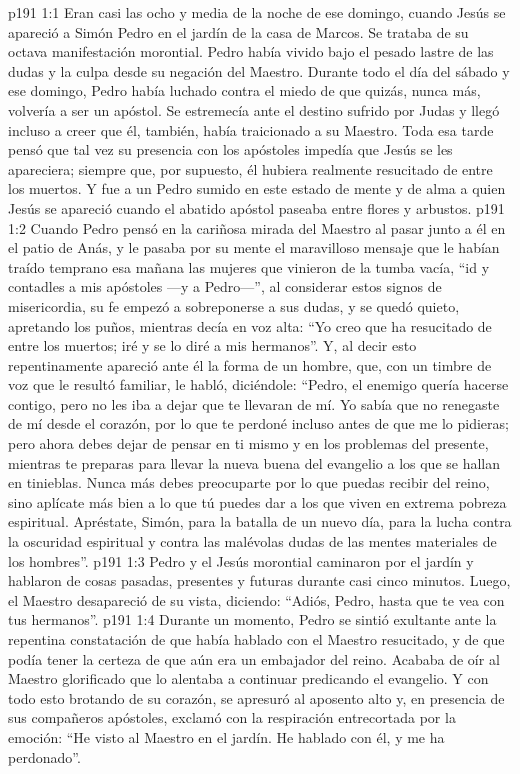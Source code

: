 \vs p191 1:1 Eran casi las ocho y media de la noche de ese domingo, cuando Jesús se apareció a Simón Pedro en el jardín de la casa de Marcos. Se trataba de su octava manifestación morontial. Pedro había vivido bajo el pesado lastre de las dudas y la culpa desde su negación del Maestro. Durante todo el día del sábado y ese domingo, Pedro había luchado contra el miedo de que quizás, nunca más, volvería a ser un apóstol. Se estremecía ante el destino sufrido por Judas y llegó incluso a creer que él, también, había traicionado a su Maestro. Toda esa tarde pensó que tal vez su presencia con los apóstoles impedía que Jesús se les apareciera; siempre que, por supuesto, él hubiera realmente resucitado de entre los muertos. Y fue a un Pedro sumido en este estado de mente y de alma a quien Jesús se apareció cuando el abatido apóstol paseaba entre flores y arbustos.
\vs p191 1:2 Cuando Pedro pensó en la cariñosa mirada del Maestro al pasar junto a él en el patio de Anás, y le pasaba por su mente el maravilloso mensaje que le habían traído temprano esa mañana las mujeres que vinieron de la tumba vacía, “id y contadles a mis apóstoles ---y a Pedro---”, al considerar estos signos de misericordia, su fe empezó a sobreponerse a sus dudas, y se quedó quieto, apretando los puños, mientras decía en voz alta: “Yo creo que ha resucitado de entre los muertos; iré y se lo diré a mis hermanos”. Y, al decir esto repentinamente apareció ante él la forma de un hombre, que, con un timbre de voz que le resultó familiar, le habló, diciéndole: “Pedro, el enemigo quería hacerse contigo, pero no les iba a dejar que te llevaran de mí. Yo sabía que no renegaste de mí desde el corazón, por lo que te perdoné incluso antes de que me lo pidieras; pero ahora debes dejar de pensar en ti mismo y en los problemas del presente, mientras te preparas para llevar la nueva buena del evangelio a los que se hallan en tinieblas. Nunca más debes preocuparte por lo que puedas recibir del reino, sino aplícate más bien a lo que tú puedes dar a los que viven en extrema pobreza espiritual. Apréstate, Simón, para la batalla de un nuevo día, para la lucha contra la oscuridad espiritual y contra las malévolas dudas de las mentes materiales de los hombres”.
\vs p191 1:3 Pedro y el Jesús morontial caminaron por el jardín y hablaron de cosas pasadas, presentes y futuras durante casi cinco minutos. Luego, el Maestro desapareció de su vista, diciendo: “Adiós, Pedro, hasta que te vea con tus hermanos”.
\vs p191 1:4 Durante un momento, Pedro se sintió exultante ante la repentina constatación de que había hablado con el Maestro resucitado, y de que podía tener la certeza de que aún era un embajador del reino. Acababa de oír al Maestro glorificado que lo alentaba a continuar predicando el evangelio. Y con todo esto brotando de su corazón, se apresuró al aposento alto y, en presencia de sus compañeros apóstoles, exclamó con la respiración entrecortada por la emoción: “He visto al Maestro en el jardín. He hablado con él, y me ha perdonado”.
